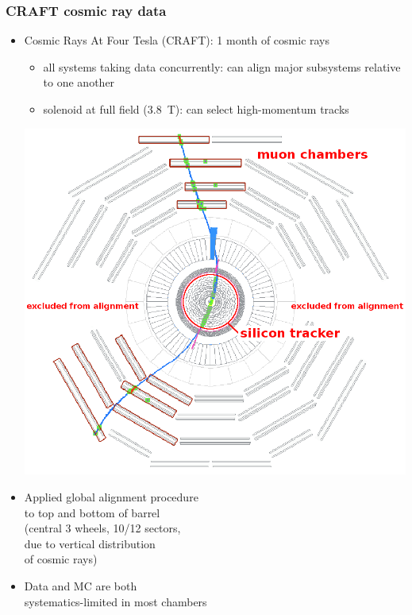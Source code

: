 \documentclass[compress]{beamer}
\begin{document}
\begin{frame}
\frametitle{CRAFT cosmic ray data}

\begin{itemize}\setlength{\itemsep}{1 cm}
\item Cosmic Rays At Four Tesla (CRAFT): 1 month of cosmic rays
\begin{itemize}
\item all systems taking data concurrently: can align major subsystems relative to one another
\item solenoid at full field (3.8~T): can select high-momentum tracks
\end{itemize}

\vspace{0.25 cm}

\hfill \includegraphics[width=0.5\linewidth]{event_display.png}
\vspace{-5 cm}

\item Applied global alignment procedure \\ to top and bottom of barrel \\ (central 3 wheels, 10/12 sectors, \\ due to vertical distribution \\ of cosmic rays)

\item Data and MC are both \\ systematics-limited in most chambers
\end{itemize}
\end{frame}
\end{document}
